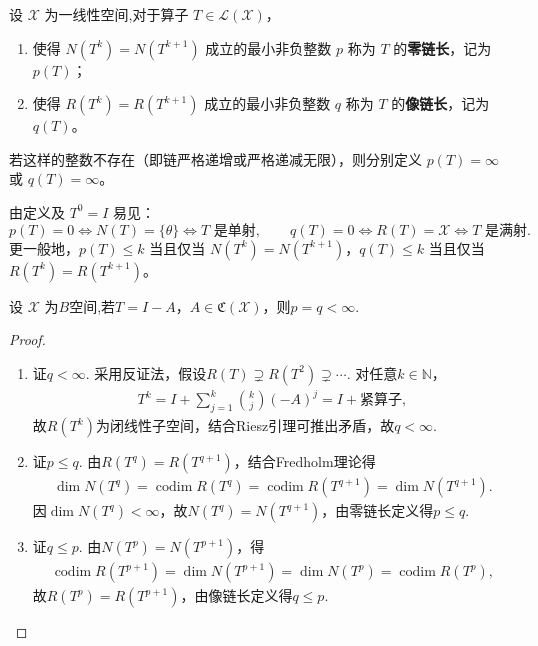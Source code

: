 \documentclass[../../main.tex]{subfiles}%
\begin{document}
\begin{definition}[零链长与像链长]
设 $\mathscr{X}$ 为一线性空间,对于算子 $T \in \mathscr{L}(\mathscr{X})$，
\begin{enumerate}[(1)]
\item 使得 $N(T^k) = N(T^{k+1})$ 成立的最小非负整数 $p$ 称为 $T$ 的\textbf{零链长}，记为 $p(T)$；
\item 使得 $R(T^k) = R(T^{k+1})$ 成立的最小非负整数 $q$ 称为 $T$ 的\textbf{像链长}，记为 $q(T)$。
\end{enumerate}
若这样的整数不存在（即链严格递增或严格递减无限），则分别定义 $p(T) = \infty$ 或 $q(T) = \infty$。
\end{definition}
\begin{remark}
由定义及 $T^0 = I$ 易见：
\[
p(T) = 0 \iff N(T) = \{\theta\} \iff T \text{ 是单射},\qquad
q(T) = 0 \iff R(T) = \mathscr{X} \iff T \text{ 是满射}.
\]
更一般地，$p(T) \leqslant k$ 当且仅当 $N(T^k) = N(T^{k+1})$，$q(T) \leqslant k$ 当且仅当 $R(T^k) = R(T^{k+1})$。
\end{remark}

\begin{lemma}
设 $\mathscr{X}$ 为$B$空间,若$T=I-A$，$A\in\mathfrak{C}(\mathscr{X})$，则$p=q<\infty$.
\end{lemma}
\begin{proof}
\begin{enumerate}[(1)]
\item 证$q<\infty$.
采用反证法，假设$R(T)\supsetneq R(T^2)\supsetneq\cdots$.
对任意$k\in\mathbb{N}$，
\begin{align*}
T^k=I+\sum\limits_{j=1}^k\binom{k}{j}(-A)^j=I+\text{紧算子},
\end{align*}
故$R(T^k)$为闭线性子空间，结合Riesz引理可推出矛盾，故$q<\infty$.

\item 证$p\leqslant q$.
由$R(T^q)=R(T^{q+1})$，结合Fredholm理论得
\begin{align*}
\dim N(T^q)=\operatorname{codim}R(T^q)=\operatorname{codim}R(T^{q+1})=\dim N(T^{q+1}).
\end{align*}
因$\dim N(T^q)<\infty$，故$N(T^q)=N(T^{q+1})$，由零链长定义得$p\leqslant q$.

\item 证$q\leqslant p$.
由$N(T^p)=N(T^{p+1})$，得
\begin{align*}
\operatorname{codim}R(T^{p+1})=\dim N(T^{p+1})=\dim N(T^p)=\operatorname{codim}R(T^p),
\end{align*}
故$R(T^p)=R(T^{p+1})$，由像链长定义得$q\leqslant p$.
\end{enumerate}

\end{proof}
\end{document}
